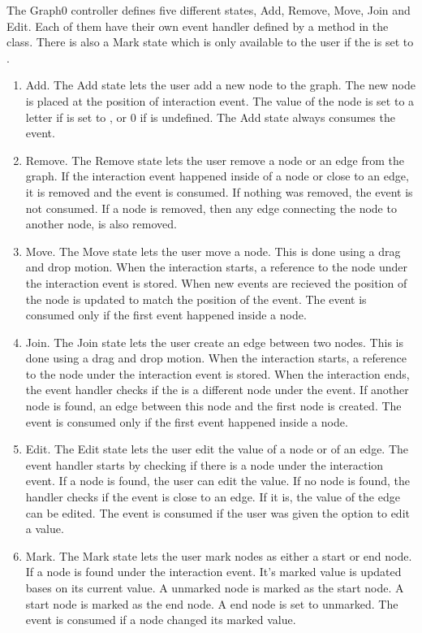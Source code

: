 The Graph0 controller defines five different states, Add, Remove, Move, Join and Edit. Each of them have their own event handler defined by a method in the class. There is also a Mark state which is only available to the user if the  is set to .
\begin{enumerate}
    \item Add. The Add state lets the user add a new node to the graph. The new node is placed at the position of interaction event. The value of the node is set to a letter if  is set to , or 0 if  is undefined. The Add state always consumes the event. 
    \item Remove. The Remove state lets the user remove a node or an edge from the graph. If the interaction event happened inside of a node or close to an edge, it is removed and the event is consumed. If nothing was removed, the event is not consumed. If a node is removed, then any edge connecting the node to another node, is also removed.
    \item Move. The Move state lets the user move a node. This is done using a drag and drop motion. When the interaction starts, a reference to the node under the interaction event is stored. When new events are recieved the position of the node is updated to match the position of the event. The event is consumed only if the first event happened inside a node.
    \item Join. The Join state lets the user create an edge between two nodes. This is done using a drag and drop motion. When the interaction starts, a reference to the node under the interaction event is stored. When the interaction ends, the event handler checks if the is a different node under the event. If another node is found, an edge between this node and the first node is created. The event is consumed only if the first event happened inside a node.
    \item Edit. The Edit state lets the user edit the value of a node or of an edge. The event handler starts by checking if there is a node under the interaction event. If a node is found, the user can edit the value. If no node is found, the handler checks if the event is close to an edge. If it is, the value of the edge can be edited. The event is consumed if the user was given the option to edit a value.
    \item Mark. The Mark state lets the user mark nodes as either a start or end node. If a node is found under the interaction event. It's marked value is updated bases on its current value. A unmarked node is marked as the start node. A start node is marked as the end node. A end node is set to unmarked. The event is consumed if a node changed its marked value.
\end{enumerate}
